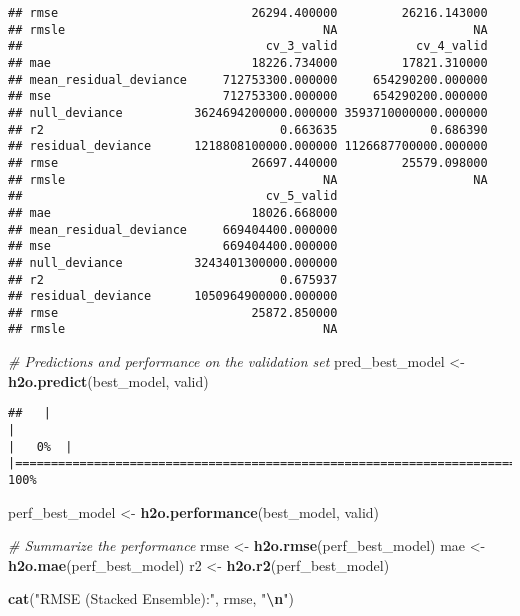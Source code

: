 \documentclass[
]{article}
\newenvironment{Shaded}{\begin{snugshade}}{\end{snugshade}}
\newcommand{\CommentTok}[1]{\textcolor[rgb]{0.56,0.35,0.01}{\textit{#1}}}
\newcommand{\FunctionTok}[1]{\textcolor[rgb]{0.13,0.29,0.53}{\textbf{#1}}}
\newcommand{\NormalTok}[1]{#1}
\newcommand{\OtherTok}[1]{\textcolor[rgb]{0.56,0.35,0.01}{#1}}
\newcommand{\SpecialCharTok}[1]{\textcolor[rgb]{0.81,0.36,0.00}{\textbf{#1}}}
\newcommand{\StringTok}[1]{\textcolor[rgb]{0.31,0.60,0.02}{#1}}
\begin{document}
\begin{verbatim}
## rmse                           26294.400000         26216.143000
## rmsle                                    NA                   NA
##                                  cv_3_valid           cv_4_valid
## mae                            18226.734000         17821.310000
## mean_residual_deviance     712753300.000000     654290200.000000
## mse                        712753300.000000     654290200.000000
## null_deviance          3624694200000.000000 3593710000000.000000
## r2                                 0.663635             0.686390
## residual_deviance      1218808100000.000000 1126687700000.000000
## rmse                           26697.440000         25579.098000
## rmsle                                    NA                   NA
##                                  cv_5_valid
## mae                            18026.668000
## mean_residual_deviance     669404400.000000
## mse                        669404400.000000
## null_deviance          3243401300000.000000
## r2                                 0.675937
## residual_deviance      1050964900000.000000
## rmse                           25872.850000
## rmsle                                    NA
\end{verbatim}

\begin{Shaded}
\begin{Highlighting}[]
\CommentTok{\# Predictions and performance on the validation set}
\NormalTok{pred\_best\_model }\OtherTok{\textless{}{-}} \FunctionTok{h2o.predict}\NormalTok{(best\_model, valid)}
\end{Highlighting}
\end{Shaded}

\begin{verbatim}
##   |                                                                              |                                                                      |   0%  |                                                                              |======================================================================| 100%
\end{verbatim}

\begin{Shaded}
\begin{Highlighting}[]
\NormalTok{perf\_best\_model }\OtherTok{\textless{}{-}} \FunctionTok{h2o.performance}\NormalTok{(best\_model, valid)}

\CommentTok{\# Summarize the performance}
\NormalTok{rmse }\OtherTok{\textless{}{-}} \FunctionTok{h2o.rmse}\NormalTok{(perf\_best\_model)}
\NormalTok{mae }\OtherTok{\textless{}{-}} \FunctionTok{h2o.mae}\NormalTok{(perf\_best\_model)}
\NormalTok{r2 }\OtherTok{\textless{}{-}} \FunctionTok{h2o.r2}\NormalTok{(perf\_best\_model)}

\FunctionTok{cat}\NormalTok{(}\StringTok{"RMSE (Stacked Ensemble):"}\NormalTok{, rmse, }\StringTok{"}\SpecialCharTok{\textbackslash{}n}\StringTok{"}\NormalTok{)}
\end{Highlighting}
\end{Shaded}
\end{document}
